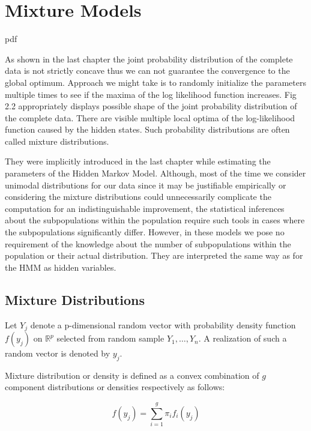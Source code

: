 \chapter{Mixture Models}

\if
pdf
    \graphicspath{{Chapter3/Figs/Raster/}{Chapter3/Figs/PDF/}{Chapter3/Figs/}}
\else
    \graphicspath{{Chapter3/Figs/Vector/}{Chapter3/Figs/}}
\fi

As shown in the last chapter the joint probability distribution of the complete 
data is not strictly concave thus we can not guarantee the convergence to the global optimum. 
Approach we might take is to randomly initialize the parameters multiple times to see 
if the maxima of the log likelihood function increases. 
Fig 2.2 appropriately displays possible shape of the joint probability distribution of the complete data. 
There are visible multiple local optima of the log-likelihood function caused by the hidden states. 
Such probability distributions are often called mixture distributions. 

They were implicitly introduced in the last chapter while estimating the parameters of the Hidden Markov Model. 
Although, most of the time we consider unimodal distributions for our data since it may be justifiable empirically 
or considering the mixture distributions could unnecessarily complicate the computation 
for an indistinguishable improvement, the statistical inferences about the subpopulations 
within the population require such tools in cases where the subpopulations significantly differ.
However, in these models we pose no requirement of the knowledge about the number of subpopulations 
within the population or their actual distribution. They are interpreted the same way as for the HMM 
as hidden variables.

\section{Mixture Distributions}

Let $Y_j$ denote a p-dimensional random vector with probability density function $f(y_j)$ on $\mathbb{R}^p$  
selected from random sample $Y_1,\ldots,Y_n$. A realization of such a random vector is denoted by $y_j$.

Mixture distribution or density is defined as a convex combination of $g$ component distributions or densities respectively 
as follows:

\begin{equation}
f(y_j) = \sum_{i=1}^{g} \pi_i f_i(y_j)
\end{equation}

